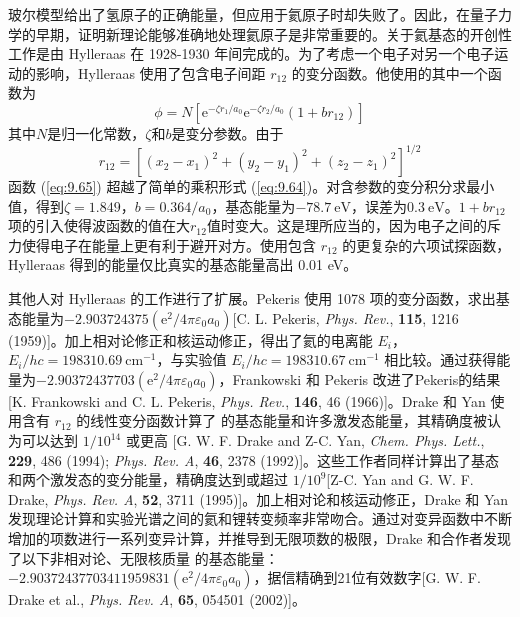     玻尔模型给出了氢原子的正确能量，但应用于氦原子时却失败了。因此，在量子力学的早期，证明新理论能够准确地处理氦原子是非常重要的。关于氦基态的开创性工作是由 Hylleraas 在 1928-1930 年间完成的。为了考虑一个电子对另一个电子运动的影响，Hylleraas 使用了包含电子间距 $r_{12}$ 的变分函数。他使用的其中一个函数为
    \begin{equation}
        \phi = N\left[\mathrm{e}^{-\zeta r_1/a_0} \mathrm{e}^{-\zeta r_2/a_0}\left(1 + br_{12}\right)\right]
        \label{eq:9.65}
    \end{equation}
    其中$N$是归一化常数，$\zeta$和$b$是变分参数。由于
    \begin{equation}
        r_{12} = \left[\left(x_2 - x_1\right)^2 + \left(y_2 - y_1\right)^2 + \left(z_2 - z_1\right)^2\right]^{1/2}
        \label{eq:9.66}
    \end{equation}
    函数 (\ref{eq:9.65}) 超越了简单的乘积形式 (\ref{eq:9.64})。对含参数的变分积分求最小值，得到$\zeta = 1.849$，$b = 0.364/a_0$，基态能量为$-78.7 \:\mathrm{eV}$，误差为$0.3 \: \mathrm{eV}$。$1+br_{12}$项的引入使得波函数的值在大$r_{12}$值时变大。这是理所应当的，因为电子之间的斥力使得电子在能量上更有利于避开对方。使用包含 $r_{12}$ 的更复杂的六项试探函数，Hylleraas 得到的能量仅比真实的基态能量高出 0.01 eV。

    其他人对 Hylleraas 的工作进行了扩展。Pekeris 使用 1078 项的变分函数，求出基态能量为$-2.903724375\left(\mathrm{e}^2 / 4\pi\varepsilon_0a_0\right)$[C. L. Pekeris, \textit{Phys. Rev.}, \textbf{115}, 1216 (1959)]。加上相对论修正和核运动修正，得出了氦的电离能 $E_i$，$E_i/hc = 198310.69 \: \mathrm{cm}^{-1}$，与实验值 $E_i/hc = 198310.67 \: \mathrm{cm}^{-1}$ 相比较。通过获得能量为$-2.90372437703 \left(\mathrm{e}^2 / 4\pi\varepsilon_0a_0\right)$，Frankowski 和 Pekeris 改进了Pekeris的结果[K. Frankowski and C. L. Pekeris, \textit{Phys. Rev.}, \textbf{146}, 46 (1966)]。Drake 和 Yan 使用含有 $r_{12}$ 的线性变分函数计算了  的基态能量和许多激发态能量，其精确度被认为可以达到 $1/10^{14}$ 或更高 [G. W. F. Drake and Z-C. Yan, \textit{Chem. Phys. Lett.}, \textbf{229}, 486 (1994); \textit{Phys. Rev. A}, \textbf{46}, 2378 (1992)]。这些工作者同样计算出了基态和两个激发态的变分能量，精确度达到或超过 $1/10^9$[Z-C. Yan and G. W. F. Drake, \textit{Phys. Rev. A}, \textbf{52}, 3711 (1995)]。加上相对论和核运动修正，Drake 和 Yan 发现理论计算和实验光谱之间的氦和锂转变频率非常吻合。通过对变异函数中不断增加的项数进行一系列变异计算，并推导到无限项数的极限，Drake 和合作者发现了以下非相对论、无限核质量  的基态能量：$-2.90372437703411959831 \left(\mathrm{e}^2 / 4\pi\varepsilon_0a_0\right)$，据信精确到21位有效数字[G. W. F. Drake et al., \textit{Phys. Rev. A}, \textbf{65}, 054501 (2002)]。

